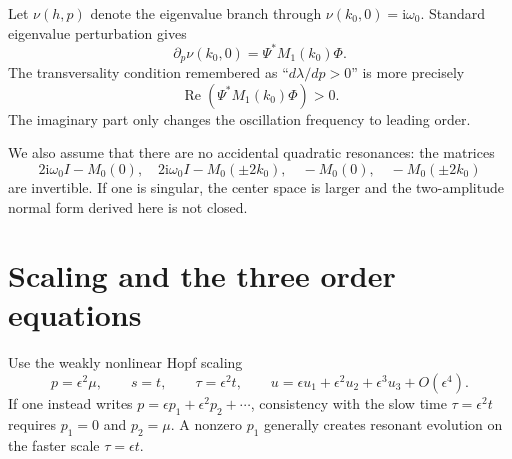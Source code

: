 \documentclass[11pt]{article}
\newcommand{\ii}{\mathrm{i}}
\DeclareMathOperator{\RePart}{Re}
\begin{document}
Let $\nu(h,p)$ denote the eigenvalue branch through
$\nu(k_0,0)=\ii\omega_0$.  Standard eigenvalue perturbation gives
\begin{equation}
  \partial_p\nu(k_0,0)=\Psi^*M_1(k_0)\Phi.
  \label{eq:eigenvalue-derivative}
\end{equation}
The transversality condition remembered as ``$d\lambda/dp>0$'' is more
precisely
\begin{equation}
  \RePart\!\left(\Psi^*M_1(k_0)\Phi\right)>0.
  \label{eq:transversality}
\end{equation}
The imaginary part only changes the oscillation frequency to leading order.

We also assume that there are no accidental quadratic resonances: the matrices
\begin{equation}
  2\ii\omega_0I-M_0(0),\quad
  2\ii\omega_0I-M_0(\pm2k_0),\quad
  -M_0(0),\quad -M_0(\pm2k_0)
  \label{eq:nonresonance-matrices}
\end{equation}
are invertible.  If one is singular, the center space is larger and the
two-amplitude normal form derived here is not closed.

\section{Scaling and the three order equations}

Use the weakly nonlinear Hopf scaling
\begin{equation}
  p=\epsilon^2\mu,
  \qquad s=t,
  \qquad \tau=\epsilon^2t,
  \qquad
  u=\epsilon u_1+\epsilon^2u_2+\epsilon^3u_3+O(\epsilon^4).
  \label{eq:scaling}
\end{equation}
If one instead writes $p=\epsilon p_1+\epsilon^2p_2+\cdots$, consistency with
the slow time $\tau=\epsilon^2t$ requires $p_1=0$ and $p_2=\mu$.  A nonzero
$p_1$ generally creates resonant evolution on the faster scale
$\tau=\epsilon t$.
\end{document}
